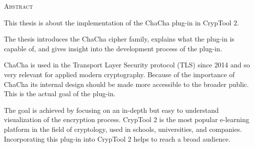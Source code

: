 
\begin{center}
  \textsc{Abstract}
\end{center}

\noindent
This thesis is about the implementation of the ChaCha plug-in in CrypTool 2.

\medskip
\noindent
The thesis introduces the ChaCha cipher family, explains what the plug-in is capable of, and gives insight into the development process of the plug-in.

\medskip
\noindent
ChaCha is used in the Transport Layer Security protocol (TLS) since 2014 and so very relevant for applied modern cryptography. Because of the importance of ChaCha its internal design should be made more accessible to the broader public. This is the actual goal of the plug-in.

\medskip
\noindent
The goal is achieved by focusing on an in-depth but easy to understand visualization of the encryption process.
CrypTool 2 is the most popular e-learning platform in the field of cryptology, used in schools, universities, and companies. Incorporating this plug-in into CrypTool 2 helps to reach a broad audience.

